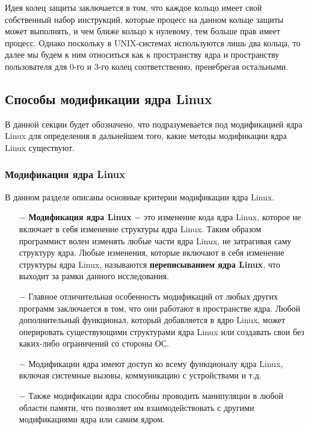 \newpage

Идея колец защиты заключается в том, что каждое кольцо имеет свой собственный набор инструкций, которые процесс на данном кольце защиты может выполнять, и чем ближе кольцо к нулевому, тем больше прав имеет процесс.
Однако поскольку в UNIX-системах используются лишь два кольца, то далее мы будем к ним относиться как к пространству ядра и пространству пользователя для 0-го и 3-го колец соответственно, пренебрегая остальными.

\subsection{Способы модификации ядра Linux}\label{sec:--anal--methods}

В данной секции будет обозначено, что подразумевается под модификацией ядра Linux для определения в дальнейшем того, какие методы модификации ядра Linux существуют.

\subsubsection{Модификация ядра Linux}\label{subsec:--anal--methods--mod}

В данном разделе описаны основные критерии модификации ядра Linux.

\begin{itemize}
    \item[$-$] \textbf{Модификация ядра Linux} $-$ это изменение кода ядра Linux, которое не включает в себя изменение структуры ядра Linux.
    Таким образом программист волен изменять любые части ядра Linux, не затрагивая саму структуру ядра.
    Любые изменения, которые включают в себя изменение структуры ядра Linux, называются \textbf{переписыванием ядра Linux}, что выходит за рамки данного исследования.
    \item[$-$] Главное отличительная особенность модификаций от любых других программ заключается в том, что они работают в пространстве ядра.
    Любой дополнительный функционал, который добавляется в ядро Linux, может оперировать существующими структурами ядра Linux или создавать свои без каких-либо ограничений со стороны ОС.
    \item[$-$] Модификации ядра имеют доступ ко всему функционалу ядра Linux, включая системные вызовы, коммуникацию с устройствами и т.д.
    \item[$-$] Также модификации ядра способны проводить манипуляции в любой области памяти, что позволяет им взаимодействовать с другими модификациями ядра или самим ядром.
\end{itemize}

